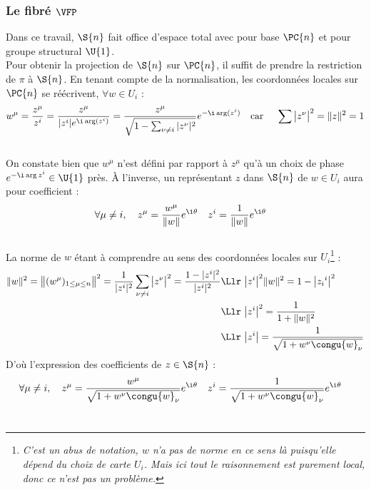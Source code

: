\subsubsection{Le fibré $\bf{\VFP}$}\label{subsec:SUPC_VFP}

Dans ce travail, $\S{n}$ fait office d'espace total avec pour base $\PC{n}$ et pour groupe structural $\U{1}$.
\\
Pour obtenir la projection de $\S{n}$ sur $\PC{n}$, il suffit de prendre la restriction de $\pi$ à $\S{n}$. En tenant compte de la normalisation, les coordonnées locales sur $\PC{n}$ se réécrivent, $\forall w\in U_i$ :
\begin{align*}
	w^\mu = \frac{z^\mu}{z^i} &= \frac{z^\mu}{|z^i|e^{\i \arg (z^i)}} = \frac{z^{\mu}}{\sqrt{1 - \sum_{\nu \neq i} |z^\nu|^2}} e^{-\i \arg(z^i)}  &  \text{car }\quad \sum \big|z^\nu\big|^2 = \|z\|^2 = 1
\end{align*}
\\
On constate bien que $w^\mu$ n'est défini par rapport à $z^\mu$ qu'à un choix de phase $e^{-\i \arg z^i}\in \U{1}$ près. À l'inverse, un représentant $z$ dans $\S{n}$ de $w\in U_i$ aura pour coefficient :
\begin{align*}
	\forall \mu\neq i,\quad {z}^\mu &= \frac{w^\mu}{\|w\|}e^{\i \theta}  &  {z}^i &= \frac{1}{\|w\|}e^{\i \theta} 
\end{align*}
\\
La norme de $w$ étant à comprendre au sens des coordonnées locales sur $U_i$\footnote{\itshape
	C'est un abus de notation, $w$ n'a pas de norme en ce sens là puisqu'elle dépend du choix de carte $U_i$. Mais ici tout le raisonnement est purement local, donc ce n'est pas un problème.
} :
\begin{align*}
	\|w\|^2 = \big\|(w^\mu)_{1\leq \mu\leq n}\big\|^2 = \frac{1}{|{z}^i|^2}\sum_{\nu \neq i} \big|{z}^\nu\big|^2 = \frac{1 - |{z}^i|^2}{|{z}^i|^2} &\Llr\ \big| {z}^i \big|^2 \|w\|^2 = 1 - \big|{z_i}^i\big|^2 \\
	&\Llr\ \big|{z}^i\big|^2 = \frac{1}{1 + \|w\|^2} \\
	&\Llr\ \big|{z}^i\big| = \frac{1}{\sqrt{1 + w^\nu \congu{w}_\nu}}
\end{align*}
D'où l'expression des coefficients de $z\in\S{n}$ :
\begin{align*}
	\forall \mu\neq i,\quad {z}^\mu &= \frac{w^\mu}{\sqrt{1 + w^\nu \congu{w}_\nu}}e^{\i \theta}  &  {z}^i &= \frac{1}{\sqrt{1 + w^\nu \congu{w}_\nu}}e^{\i \theta} 
\end{align*}
\\

